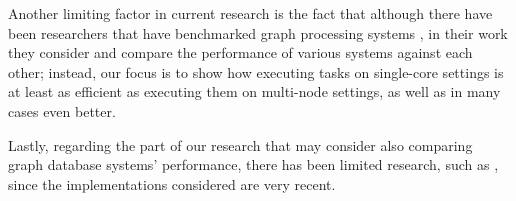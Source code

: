 \documentclass[a4paper,11pt]{article}
\begin{document}
\par Another limiting factor in current research is the fact that although there have been researchers that have benchmarked graph processing systems \cite{benchmarking-vision, how-well, graphalytics, scalability-cost}, in their work they consider and compare the performance of various systems against each other; instead, our focus is to show how executing tasks on single-core settings is at least as efficient as executing them on multi-node settings, as well as in many cases even better.

\par Lastly, regarding the part of our research that may consider also comparing graph database systems' performance, there has been limited research, such as \cite{traversal-benchmarking}, since the implementations considered \cite{emptyheaded} are very recent.






\end{document}
